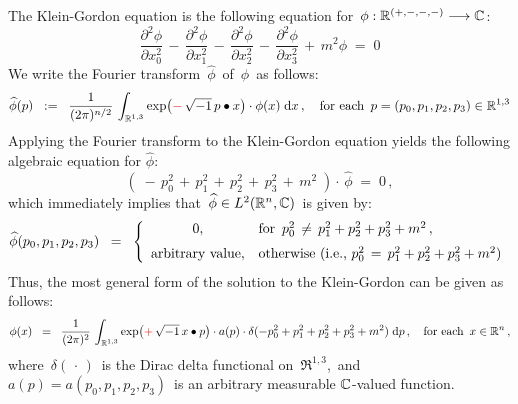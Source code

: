 \noindent
The Klein-Gordon equation is the following equation
for \,$\phi : \mathbb{R}^{(+,-,-,-)} \longrightarrow \mathbb{C}$:
\begin{equation*}
\dfrac{\partial^{2}\phi}{\partial x_{0}^{2}}
\,-\,
\dfrac{\partial^{2}\phi}{\partial x_{1}^{2}}
\,-\,
\dfrac{\partial^{2}\phi}{\partial x_{2}^{2}}
\,-\,
\dfrac{\partial^{2}\phi}{\partial x_{3}^{2}}
\,+\,
m^{2}\phi
\; = \;
0
\end{equation*}
We write the Fourier transform \,$\widehat{\phi}$\, of \,$\phi$\, as follows:
\begin{equation*}
\widehat{\phi}(p)
\;\; := \;\;
	\dfrac{1}{(2\pi)^{n/2}}\,
	\int_{\Re^{1,3}}
		\exp\!\left({\color{red}-}\,\sqrt{-1}\, p \overset{{\color{white}.}}{\bullet} x\right) \cdot \phi(x)
		\;\d x\,,
\quad
\textnormal{for each \,$p = (p_{0},p_{1},p_{2},p_{3}) \in \Re^{1,3}$}
\end{equation*}
Applying the Fourier transform to the Klein-Gordon equation yields
the following algebraic equation for $\widehat{\phi}$:
\begin{equation*}
\left(\;
	-\,
	p_{0}^{2}
	\,+\,
	p_{1}^{2}
	\,+\,
	p_{2}^{2}
	\,+\,
	p_{3}^{2}
	\,+\,
	m^{2}
	\;\right)
	\cdot\,\widehat{\phi}
\; = \;
	0\,,
\end{equation*}
which immediately implies that \,$\widehat{\phi} \in L^{2}(\mathbb{R}^{n},\mathbb{C})$\, is given by:
\begin{equation*}
\widehat{\phi}(p_{0},p_{1},p_{2},p_{3})
\;\; = \;\;
	\left\{\begin{array}{cl}
		0, & \textnormal{for \,$p_{0}^{2} \,\neq\, p_{1}^{2} + p_{2}^{2} + p_{3}^{2} + m^{2}$}\,,
		\\
		\overset{{\color{white}1}}{\textnormal{arbitrary value}}, & \textnormal{otherwise (i.e., $p_{0}^{2} \,=\, p_{1}^{2} + p_{2}^{2} + p_{3}^{2} + m^{2}$)}
		\end{array}\right.
\end{equation*}
Thus, the most general form of the solution to the Klein-Gordon can be given as follows:
\begin{equation*}
\phi(x)
\;\; = \;\;
	\dfrac{1}{(2\pi)^{2}}\,
	\int_{\Re^{1,3}}
		\exp\!\left({\color{red}+}\,\sqrt{-1}\, x \overset{{\color{white}.}}{\bullet} p\right)
		\cdot
		a(p)
		\cdot
		\delta(-p_{0}^{2} + p_{1}^{2} + p_{2}^{2} + p_{3}^{2} + m^{2})
		\;\d p\,,
\quad
\textnormal{for each \,$x \in \Re^{n}$}\,,
\end{equation*}
where
\,$\delta(\,\cdot\,)$\, is the Dirac delta functional on \,$\Re^{1,3}$,\, and
\,$a(p) = a(p_{0},p_{1},p_{2},p_{3})$\, is an arbitrary measurable $\mathbb{C}$-valued function.
